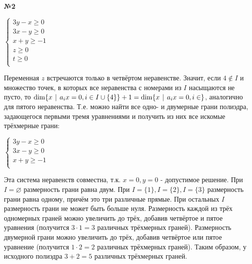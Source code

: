 \documentclass{article}
\newenvironment{task}{\begin{center}\fontsize{14}{14}\selectfont\bf}{\rm\fontsize{12}{12}\selectfont\end{center}}
\newcommand{\tch}{\hspace{4px}|\hspace{4px}}
\begin{document}
	\begin{task} 
		№2
	\end{task}
	\begin{center}
		$\begin{cases}
		3y - x \geq 0 \\
		3x - y \geq 0 \\
		x +y \geq -1 \\
		z \geq 0 \\
		t \geq 0 \\
		\end{cases}$
	\end{center}
	Переменная $z$ встречаются только в четвёртом неравенстве. Значит, если $4 \not\in I$ и множество точек, в которых все неравенства с номерами из $I$ насыщаются не пусто, то 
	$\dim \lbrace x \tch a_ix = 0, i \in I\cup\lbrace4\rbrace\rbrace + 1= \dim \lbrace x \tch a_ix = 0, i \in \rbrace$, аналогично для пятого неравенства. Т.е. можно найти все одно- и двумерные грани полиэдра, задающегося первыми тремя уравнениями и получить из них все искомые трёхмерные грани:
	\begin{center}
		$\begin{cases}
		3y - x \geq 0 \\
		3x - y \geq 0 \\
		x +y \geq -1 \\
		\end{cases}$
	\end{center}
	Эта система неравенств совместна, т.к. $x=0, y=0$ - допустимое решение. При $I = \varnothing$ размерность грани равна двум. При $I =\lbrace1\rbrace, I =\lbrace2\rbrace, I =\lbrace3\rbrace$ размерность грани равна одному, причём это три различные прямые. При остальных $I$ размерность грани не может быть больше нуля.
	Размерность каждой из трёх одномерных граней можно увеличить до трёх, добавив четвёртое и пятое уравнения (получится $3\cdot1=3$ различных трёхмерных граней). Размерность двумерной грани можно увеличить до трёх, добавив четвёртое или пятое уравнение (получится $1\cdot2=2$ различных трёхмерных граней).
	Таким образом, у исходного полиэдра $3 + 2 = 5$ различных трёхмерных граней.


	
\end{document}
